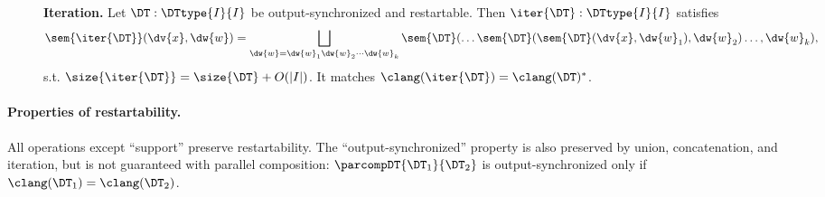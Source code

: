 \begin{figure}[H]
\begin{dtbox}
\textbf{Iteration.}
Let $\DT: \DTtype{I}{I}$ be output-synchronized and restartable.
Then $\iter{\DT}: \DTtype{I}{I}$ satisfies
\[
\sem{\iter{\DT}}(\dv{x},\dw{w})
= \bigsqcup_{\dw{w} = \dw{w}_1 \dw{w}_2 \cdots \dw{w}_k} \sem{\DT}(\ldots \sem{\DT}(\sem{\DT}(\dv{x},\dw{w}_1) ,\dw{w}_2)\ldots,\dw{w}_k),
\]
s.t. $\size{\iter{\DT}} = \size{\DT} + O(|I|)$.
It matches $\clang(\iter{\DT}) = \clang(\DT)^{*}$.
\end{dtbox}

\label{dt:fig:iteration}
\end{figure}

\paragraph*{Properties of restartability.}
All operations except ``support'' preserve restartability.
The ``output-synchronized'' property is also preserved by union, concatenation, and iteration, but is not guaranteed with parallel composition: $\parcompDT{\DT_1}{\DT_2}$ is output-synchronized only if $\clang(\DT_1) = \clang(\DT_2)$.

